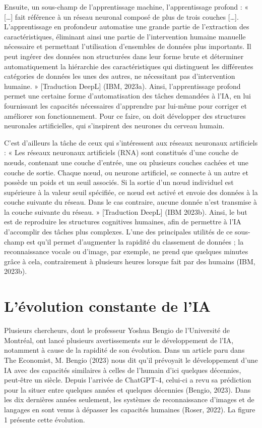 \documentclass[
  letterpaper,
  DIV=11,
  numbers=noendperiod]{scrreprt}
\begin{document}
Ensuite, un sous-champ de l'apprentissage machine, l'apprentissage
profond : « {[}\ldots{]} fait référence à un réseau neuronal composé de
plus de trois couches {[}\ldots{]}. L'apprentissage en profondeur
automatise une grande partie de l'extraction des caractéristiques,
éliminant ainsi une partie de l'intervention humaine manuelle nécessaire
et permettant l'utilisation d'ensembles de données plus importants. Il
peut ingérer des données non structurées dans leur forme brute et
déterminer automatiquement la hiérarchie des caractéristiques qui
distinguent les différentes catégories de données les unes des autres,
ne nécessitant pas d'intervention humaine. » {[}Traduction DeepL{]}
(IBM, 2023a). Ainsi, l'apprentissage profond permet une certaine forme
d'automatisation des tâches demandées à l'IA, en lui fournissant les
capacités nécessaires d'apprendre par lui-même pour corriger et
améliorer son fonctionnement. Pour ce faire, on doit développer des
structures neuronales artificielles, qui s'inspirent des neurones du
cerveau humain.

C'est d'ailleurs la tâche de ceux qui s'intéressent aux réseaux
neuronaux artificiels : « Les réseaux neuronaux artificiels (RNA) sont
constitués d'une couche de nœuds, contenant une couche d'entrée, une ou
plusieurs couches cachées et une couche de sortie. Chaque nœud, ou
neurone artificiel, se connecte à un autre et possède un poids et un
seuil associés. Si la sortie d'un nœud individuel est supérieure à la
valeur seuil spécifiée, ce nœud est activé et envoie des données à la
couche suivante du réseau. Dans le cas contraire, aucune donnée n'est
transmise à la couche suivante du réseau. » {[}Traduction DeepL{]} (IBM
2023b). Ainsi, le but est de reproduire les structures cognitives
humaines, afin de permettre à l'IA d'accomplir des tâches plus
complexes. L'une des principales utilités de ce sous-champ est qu'il
permet d'augmenter la rapidité du classement de données ; la
reconnaissance vocale ou d'image, par exemple, ne prend que quelques
minutes grâce à cela, contrairement à plusieurs heures lorsque fait par
des humains (IBM, 2023b).

\section{L'évolution constante de
l'IA}\label{luxe9volution-constante-de-lia}

Plusieurs chercheurs, dont le professeur Yoshua Bengio de l'Université
de Montréal, ont lancé plusieurs avertissements sur le développement de
l'IA, notamment à cause de la rapidité de son évolution. Dans un article
paru dans The Economist, M. Bengio (2023) nous dit qu'il prévoyait le
développement d'une IA avec des capacités similaires à celles de
l'humain d'ici quelques décennies, peut-être un siècle. Depuis l'arrivée
de ChatGPT-4, celui-ci a revu sa prédiction pour la situer entre
quelques années et quelques décennies (Bengio, 2023). Dans les dix
dernières années seulement, les systèmes de reconnaissance d'images et
de langages en sont venus à dépasser les capacités humaines (Roser,
2022). La figure 1 présente cette évolution.
\end{document}
